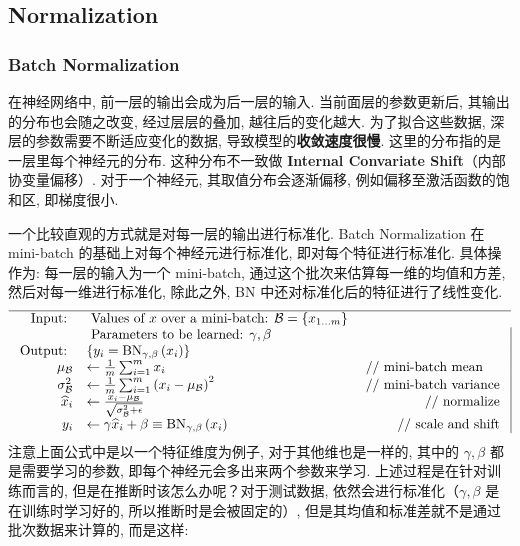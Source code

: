 \subsection{Normalization}
\subsubsection{Batch Normalization}
在神经网络中, 前一层的输出会成为后一层的输入. 当前面层的参数更新后, 其输出的分布也会随之改变, 经过层层的叠加, 越往后的变化越大. 为了拟合这些数据, 深层的参数需要不断适应变化的数据, 导致模型的\textbf{收敛速度很慢}. 这里的分布指的是一层里每个神经元的分布. 这种分布不一致做 \textbf{Internal Convariate Shift}（内部协变量偏移）. 对于一个神经元, 其取值分布会逐渐偏移, 例如偏移至激活函数的饱和区, 即梯度很小. 

一个比较直观的方式就是对每一层的输出进行标准化. Batch Normalization 在 mini-batch 的基础上对每个神经元进行标准化, 即对每个特征进行标准化. 具体操作为: 每一层的输入为一个 mini-batch, 通过这个批次来估算每一维的均值和方差, 然后对每一维进行标准化, 除此之外, BN 中还对标准化后的特征进行了线性变化. 
$$
\begin{array}{rlr|}
	\hline \text { Input: } & \text { Values of } x \text { over a mini-batch: } \mathcal{B}=\left\{x_{1 \ldots m}\right\} \\
	& \text { Parameters to be learned: } \gamma, \beta & \\
	\text { Output: } & \left\{y_{i}=\operatorname{BN}_{\gamma, \beta}\left(x_{i}\right)\right\} & \\
	\mu_{\mathcal{B}} & \leftarrow \frac{1}{m} \sum_{i=1}^{m} x_{i} & \multicolumn{1}{l|}{\text { // mini-batch mean }} \\
	\sigma_{\mathcal{B}}^{2} & \leftarrow \frac{1}{m} \sum_{i=1}^{m}\left(x_{i}-\mu_{\mathcal{B}}\right)^{2} & \text { // mini-batch variance } \\
	\widehat{x}_{i} & \leftarrow \frac{x_{i}-\mu_{\mathcal{B}}}{\sqrt{\sigma_{\mathcal{B}}^{2}+\epsilon}} & \text { // normalize } \\
	y_{i} & \leftarrow \gamma \widehat{x}_{i}+\beta \equiv \mathrm{BN}_{\gamma, \beta}\left(x_{i}\right) & \text { // scale and shift }
\end{array}
$$
注意上面公式中是以一个特征维度为例子, 对于其他维也是一样的, 其中的 $\gamma, \beta$ 都是需要学习的参数, 即每个神经元会多出来两个参数来学习. 上述过程是在针对训练而言的, 但是在推断时该怎么办呢？对于测试数据, 依然会进行标准化（$\gamma, \beta$ 是在训练时学习好的, 所以推断时是会被固定的）, 但是其均值和标准差就不是通过批次数据来计算的, 而是这样: 
